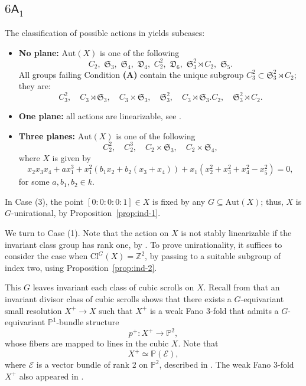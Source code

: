 \documentclass[12pt,reqno]{amsart}
\theoremstyle{plain}
\theoremstyle{remark}
\theoremstyle{definition}
\numberwithin{equation}{section}
\def\sA{{\mathsf A}}
\def\fS{{\mathfrak S}}
\def\fS{{\mathfrak S}}
\def\bP{{\mathbb P}}
\def\bZ{{\mathbb Z}}
\def\Aut{\mathrm{Aut}}
\begin{document}
\subsection*{$6\sA_1$} 
The classification of possible actions in \cite[Section 7]{CTZ-cubic} yields subcases:
    \begin{itemize} 
    \item[(1)] {\bf No plane:} $\Aut(X)$ is one of the following
    $$
C_2, \,\,\fS_3, \,\,\fS_4, \,\,\mathfrak D_4, \,\,C_2^2, \,\,\mathfrak D_6, \,\,\fS_3^2\rtimes C_2, \,\,\fS_5. 
    $$
All groups failing  Condition {\bf (A)} contain the unique subgroup 
$C_3^2\subset \fS_3^2\rtimes C_2$; they are: 
$$
C_3^2, \quad 
C_3\rtimes\fS_3, \quad 
C_3\times\fS_3, \quad  
\fS_3^2,  \quad 
C_3\rtimes \fS_3.C_2, \quad 
\fS_3^2\rtimes C_2.
$$




\item[(2)]
{\bf One plane:} all actions are linearizable, see \cite[Section 7]{CTZ-cubic}.
\item[(3)] 
{\bf Three planes:}  $\Aut(X)$ is one of the following
$$
C_2^2, \quad C_2^3,\quad C_2\times\fS_3, \quad C_2\times\fS_4,
$$
where $X$ is given by 
$$
x_2x_3x_4+ax_1^3+x_1^2(b_1x_2+b_2(x_3+x_4))+x_1(x_2^2+x_3^2+x_4^2-x_5^2)=0,
$$
for some $a,b_1,b_2\in k$. 
\end{itemize}

In Case (3), the point $[0:0:0:0:1]\in X$ is fixed by any $G\subseteq \Aut(X)$; thus, $X$ is $G$-unirational, by 
Proposition~\ref{prop:ind-1}.



We turn to Case (1).
Note that the action on $X$ is not stably linearizable if 
the invariant class group has rank one, by \cite[Proposition 7.5]{CTZ-cubic}. To prove unirationality, it suffices to consider
the case when $\mathrm{Cl}^{G}(X)=\bZ^2$, by passing to a suitable subgroup of index two, using Proposition~\ref{prop:ind-2}. 

This $G$ leaves invariant each class of cubic scrolls on $X$. 
Recall from \cite[Diagram 7.1]{CTZ-cubic} that an invariant divisor class of cubic scrolls shows that there exists a $G$-equivariant small resolution $X^+\to X$ such that $X^+$ is a weak Fano 3-fold that admits a $G$-equivariant $\mathbb{P}^1$-bundle structure
$$
p^+: X^+\to \bP^2,
$$
whose fibers are mapped to lines in the cubic $X$. 
Note that 
$$
X^+\simeq\bP(\mathcal E),
$$
where $\mathcal{E}$ is a vector bundle of rank 2 on $\mathbb{P}^2$,  described in  \cite[Theorem~3.2(7)]{langer}. The weak Fano 3-fold $X^+$ also appeared in \cite[Theorem~3.6]{Jahnke}. 
\end{document}
